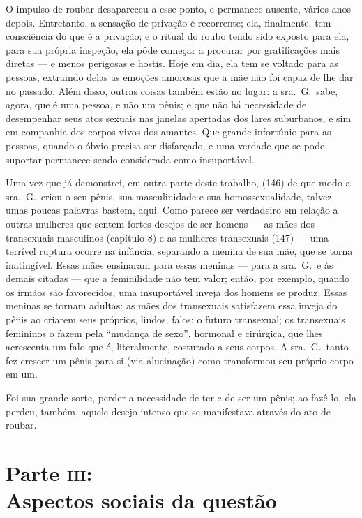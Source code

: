 \bigskip

O impulso de roubar desapareceu a esse ponto, e permanece ausente,
vários anos depois. Entretanto, a sensação de privação é recorrente;
ela, finalmente, tem consciência do que é a privação; e o ritual do
roubo tendo sido exposto para ela, para sua própria inspeção, ela pôde
começar a procurar por gratificações mais diretas --- e menos
perigosas e hostis. Hoje em dia, ela tem se voltado para as pessoas,
extraindo delas as emoções amorosas que a mãe não foi capaz de lhe dar
no passado. Além disso, outras coisas também estão no lugar: a sra.~G.~sabe, agora, que é uma pessoa, e não um pênis; e que não há
necessidade de desempenhar seus atos sexuais nas janelas apertadas dos
lares suburbanos, e sim em companhia dos corpos vivos dos amantes. Que
grande infortúnio para as pessoas, quando o óbvio precisa ser
disfarçado, e uma verdade que se pode suportar permanece sendo
considerada como insuportável.

Uma vez que já demonstrei, em outra parte deste trabalho, (146) de
que modo a sra.~G.~criou o seu pênis,\idxpenisimag{} sua masculinidade e sua
homossexualidade, talvez umas poucas palavras bastem, aqui. Como parece
ser verdadeiro em relação a outras mulheres que sentem fortes desejos
de ser homens --- as mães\idxmaesfilh{} dos transexuais masculinos (capítulo 8) e as
mulheres transexuais (147) --- uma terrível ruptura ocorre na
infância, separando a menina de sua mãe, que se torna inatingível.
Essas mães ensinaram para essas meninas --- para a sra.~G.~e às demais
citadas --- que a feminilidade não tem valor; então, por exemplo,
quando os irmãos são favorecidos, uma insuportável inveja dos homens se
produz. Essas meninas se tornam adultas: as mães dos transexuais
satisfazem essa inveja do pênis ao criarem seus próprios, lindos,
falos:\idxmaesfalo{} o futuro transexual; os transexuais femininos o fazem pela
``mudança de sexo'', hormonal e cirúrgica,
que lhes acrescenta um falo que é, literalmente, costurado a seus
corpos. A sra.~G.~tanto fez crescer um pênis para si (via alucinação)
como transformou seu próprio corpo em um.

Foi sua grande sorte, perder a necessidade de ter e de ser um pênis;
ao fazê-lo, ela perdeu, também, aquele desejo intenso que se
manifestava através do ato de roubar.



\part[Parte \textsc{iii}: Aspectos sociais da questão]{Parte \textsc{iii}:\\ Aspectos sociais da questão}


